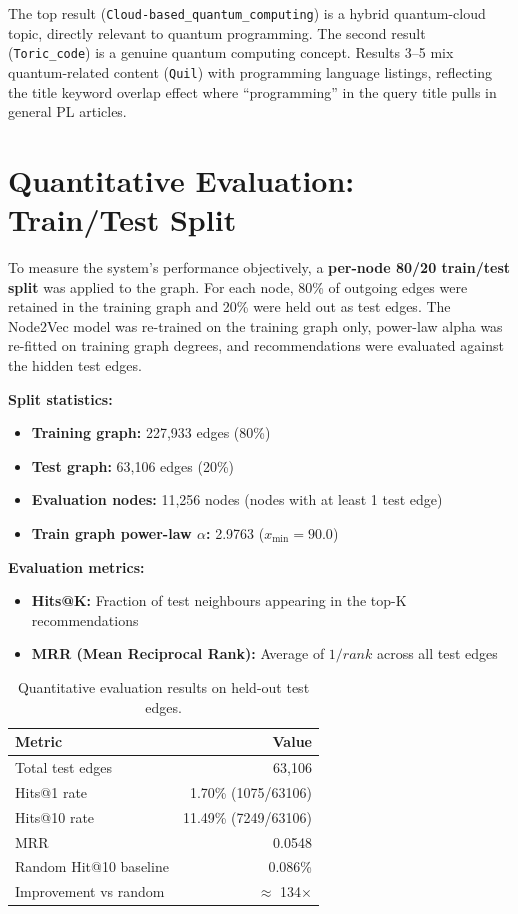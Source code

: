 \documentclass[12pt,a4paper]{article}
\begin{document}
The top result (\texttt{Cloud-based\_quantum\_computing}) is a hybrid
quantum-cloud topic, directly relevant to quantum programming.  The second
result (\texttt{Toric\_code}) is a genuine quantum computing concept.  Results
3--5 mix quantum-related content (\texttt{Quil}) with programming language
listings, reflecting the title keyword overlap effect where ``programming''
in the query title pulls in general PL articles.

\section{Quantitative Evaluation: Train/Test Split}

To measure the system's performance objectively, a \textbf{per-node 80/20 train/test split}
was applied to the graph. For each node, 80\% of outgoing edges were retained in the
training graph and 20\% were held out as test edges. The Node2Vec model was re-trained
on the training graph only, power-law alpha was re-fitted on training graph degrees,
and recommendations were evaluated against the hidden test edges.

\textbf{Split statistics:}
\begin{itemize}
    \item \textbf{Training graph:} 227,933 edges (80\%)
    \item \textbf{Test graph:} 63,106 edges (20\%)
    \item \textbf{Evaluation nodes:} 11,256 nodes (nodes with at least 1 test edge)
    \item \textbf{Train graph power-law $\alpha$:} 2.9763 ($x_{\min} = 90.0$)
\end{itemize}

\textbf{Evaluation metrics:}
\begin{itemize}
    \item \textbf{Hits@K:} Fraction of test neighbours appearing in the top-K recommendations
    \item \textbf{MRR (Mean Reciprocal Rank):} Average of $1/rank$ across all test edges
\end{itemize}

\begin{table}[H]
\centering
\caption{Quantitative evaluation results on held-out test edges.}
\label{tab:eval}
\begin{tabular}{lr}
\toprule
\textbf{Metric} & \textbf{Value} \\
\midrule
Total test edges & 63,106 \\
Hits@1 rate & 1.70\% (1075/63106) \\
Hits@10 rate & 11.49\% (7249/63106) \\
MRR & 0.0548 \\
Random Hit@10 baseline & 0.086\% \\
Improvement vs random & $\approx$ 134$\times$ \\
\bottomrule
\end{tabular}
\end{table}
\end{document}
